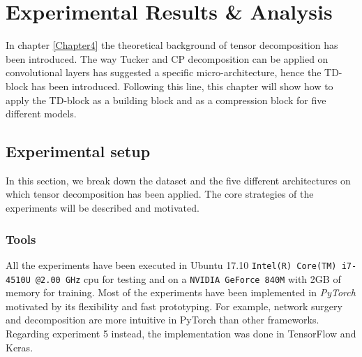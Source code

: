 \chapter{Experimental Results \& Analysis} %
\label{Chapter5}
\def \teoria {Figures/teoria}
\def \path	 {Figures/C5}
\def \plots  {Figures/plots}

In chapter \ref{Chapter4} the theoretical background of tensor decomposition has been introduced. The way Tucker and CP decomposition can be applied on convolutional layers has suggested a specific micro-architecture, hence the TD-block has been introduced. Following this line, this chapter will show how to apply the TD-block as a building block and as a compression block for five different models. 


\section{Experimental setup}
In this section, we break down the dataset and the five different architectures on which tensor decomposition has been applied. The core strategies of the experiments will be described and motivated. 


\subsection{Tools}
All the experiments have been executed in Ubuntu 17.10 \texttt{Intel(R) Core(TM) i7-4510U @2.00 GHz} cpu for testing and on a \texttt{NVIDIA GeForce 840M} with 2GB of memory for training. Most of the experiments have been implemented in \emph{PyTorch} \parencite{pytorch} motivated by its flexibility and fast prototyping. For example, network surgery and decomposition are more intuitive in PyTorch than other frameworks. Regarding experiment 5 instead, the implementation was done in TensorFlow\parencite{tensorflow} and Keras\parencite{keras}.  


